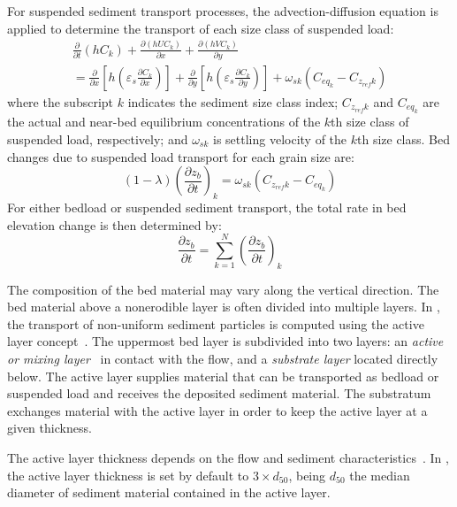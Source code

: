 For suspended sediment transport processes, the advection-diffusion equation is applied to determine the transport of each size class of suspended load:
\begin{multline}
\frac{\partial}{\partial t}\left(hC_k\right)+\frac{\partial (hUC_k)}{\partial x} + \frac{\partial (hVC_k)}{\partial y} \\
=\frac{\partial}{\partial x}\left[h\left(\varepsilon_s\frac{\partial C_k}{\partial x}\right)\right]+
\frac{\partial}{\partial y}\left[h\left(\varepsilon_s\frac{\partial C_k}{\partial y}\right)\right]+
\omega_{sk}\left(C_{eq_k}-C_{z_{ref}k}\right)
\end{multline}
where the subscript $k$ indicates the sediment size class index; $C_{z_{ref}k}$ and $C_{eq_k}$ are the actual and near-bed equilibrium concentrations of the $k$th size class of suspended load, respectively; and $\omega_{sk}$ is settling velocity of the $k$th size class.
\noindent
Bed changes due to suspended load transport for each grain size are:
\begin{equation}
(1-\lambda)\left(\frac{\partial z_b}{\partial t}\right)_k = \omega_{sk}\left(C_{z_{ref}k}-C_{eq_k}\right)
\end{equation}
\noindent
For either bedload or suspended sediment transport, the total rate in bed elevation change is then determined by:
\begin{equation}
\frac{\partial z_b}{\partial t} = \sum_{k=1}^N\left(\frac{\partial z_b}{\partial t}\right)_k
\end{equation}
\noindent

The composition of the bed material may vary along the vertical direction. The bed material above a nonerodible layer is often divided into multiple layers. In \sisyphe, the transport of non-uniform sediment particles is computed using the active layer concept~\cite{ElKadiAbderrezzak201675}. The uppermost bed layer is subdivided into two layers: an \textit{active or mixing layer}~\cite{Hirano1971} in contact with the flow, and a \textit{substrate layer} located directly below. The active layer supplies material that can be transported as bedload or suspended load and receives the deposited sediment material. The substratum exchanges material with the active layer in order to keep the active layer at a given thickness.

The active layer thickness depends on the flow and sediment characteristics~\cite{vanRijn87}. In \sisyphe{}, the active layer thickness is set by default to $3\times d_{50}$, being $d_{50}$ the median diameter of sediment material contained in the active layer.


